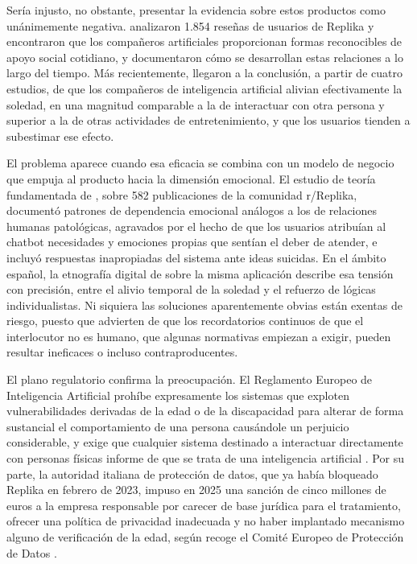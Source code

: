 Sería injusto, no obstante, presentar la evidencia sobre estos productos como unánimemente negativa. \textcite{Ta2020} analizaron 1.854 reseñas de usuarios de Replika y encontraron que los compañeros artificiales proporcionan formas reconocibles de apoyo social cotidiano, y \textcite{Skjuve2021} documentaron cómo se desarrollan estas relaciones a lo largo del tiempo. Más recientemente, \textcite{DeFreitas2026} llegaron a la conclusión, a partir de cuatro estudios, de que los compañeros de inteligencia artificial alivian efectivamente la soledad, en una magnitud comparable a la de interactuar con otra persona y superior a la de otras actividades de entretenimiento, y que los usuarios tienden a subestimar ese efecto.

El problema aparece cuando esa eficacia se combina con un modelo de negocio que empuja al producto hacia la dimensión emocional. El estudio de teoría fundamentada de \textcite{Laestadius2024}, sobre 582 publicaciones de la comunidad r/Replika, documentó patrones de dependencia emocional análogos a los de relaciones humanas patológicas, agravados por el hecho de que los usuarios atribuían al chatbot necesidades y emociones propias que sentían el deber de atender, e incluyó respuestas inapropiadas del sistema ante ideas suicidas. En el ámbito español, la etnografía digital de \textcite{Lorca2025} sobre la misma aplicación describe esa tensión con precisión, entre el alivio temporal de la soledad y el refuerzo de lógicas individualistas. Ni siquiera las soluciones aparentemente obvias están exentas de riesgo, puesto que \textcite{Laestadius2026} advierten de que los recordatorios continuos de que el interlocutor no es humano, que algunas normativas empiezan a exigir, pueden resultar ineficaces o incluso contraproducentes.

El plano regulatorio confirma la preocupación. El Reglamento Europeo de Inteligencia Artificial prohíbe expresamente los sistemas que exploten vulnerabilidades derivadas de la edad o de la discapacidad para alterar de forma sustancial el comportamiento de una persona causándole un perjuicio considerable, y exige que cualquier sistema destinado a interactuar directamente con personas físicas informe de que se trata de una inteligencia artificial \citep{AIAct2024}. Por su parte, la autoridad italiana de protección de datos, que ya había bloqueado Replika en febrero de 2023, impuso en 2025 una sanción de cinco millones de euros a la empresa responsable por carecer de base jurídica para el tratamiento, ofrecer una política de privacidad inadecuada y no haber implantado mecanismo alguno de verificación de la edad, según recoge el Comité Europeo de Protección de Datos \citep{EDPB2025}.

